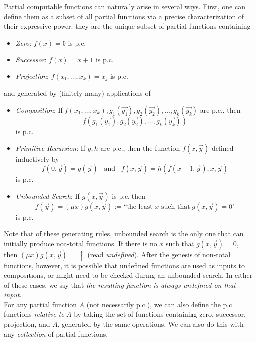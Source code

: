 \documentclass{amsart}
\begin{document}
	Partial computable functions can naturally arise in several ways. First, one can define them as a subset of all partial functions via a precise characterization of their expressive power: they are the unique subset of partial functions containing
	\begin{itemize}
		\item \textit{Zero}: $f(x)=0$ is p.c.
		\item \textit{Successor}: $f(x) = x+1$ is p.c.
		\item \textit{Projection}: $f(x_1,\dots,x_k) = x_j$ is p.c.
	\end{itemize}
	and generated by (finitely-many) applications of
	\begin{itemize}
		\item \textit{Composition}: If $f(x_1,\dots,x_k),g_1(\vec{y_1}),g_2(\vec{y_2}),\dots,g_k(\vec{y_k})$ are p.c., then 
		$$f(g_1(\vec{y_1}),g_2(\vec{y_2}),\dots,g_k(\vec{y_k}))$$ 
		is p.c.
		\item \textit{Primitive Recursion}: If $g,h$ are p.c., then the function $f(x,\vec{y})$ defined inductively by $$f(0,\vec{y})= g(\vec{y})\;\;\; \text{and} \;\;\; f(x,\vec{y})=h(f(x-1,\vec{y}),x,\vec{y})$$ 
		is p.c.
		\item \textit{Unbounded Search}: If $g(x,\vec{y})$ is p.c. then 
		$$f(\vec{y})= (\mu x) g(x,\vec{y}) := \text{``the least $x$ such that $g(x,\vec{y})=0$"}$$ 
		is p.c.  
	\end{itemize}
	Note that of these generating rules, unbounded search is the only one that can initially produce non-total functions. If there is no $x$ such that $g(x,\vec{y})=0$, then $(\mu x)g(x,\vec{y}) =\, \uparrow$ (read \textit{undefined}). After the genesis of non-total functions, however, it is possible that undefined functions are used as inputs to compositions, or might need to be checked during an unbounded search. In either of these cases, we say that \textit{the resulting function is always undefined on that input}.\\
	\indent For any partial function $A$ (not necessarily p.c.), we can also define the p.c. functions \textit{relative to} $A$ by taking the set of functions containing zero, successor, projection, and $A$, generated by the same operations. We can also do this with any \textit{collection} of partial functions.\\ 
	
\end{document}
